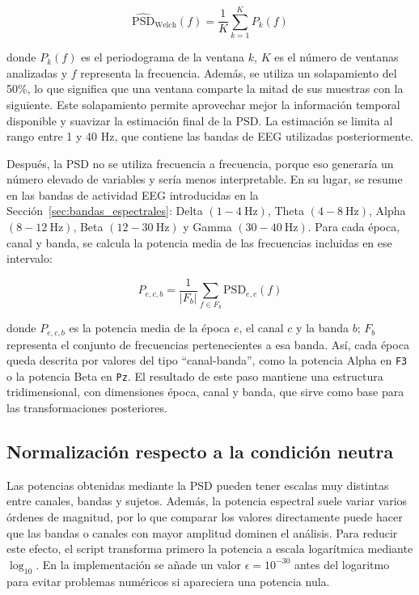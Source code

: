 \begin{myequation}[H]
\[
\widehat{\mathrm{PSD}}_{\mathrm{Welch}}(f) = \frac{1}{K}\sum_{k=1}^{K} P_k(f)
\]
\caption{Estimación de la densidad espectral de potencia mediante el método de Welch.}
\label{eq:welch_psd}
\end{myequation}

donde \(P_k(f)\) es el periodograma de la ventana \(k\), \(K\) es el número de ventanas analizadas y \(f\) representa la frecuencia. Además, se utiliza un solapamiento del 50\%, lo que significa que una ventana comparte la mitad de sus muestras con la siguiente. Este solapamiento permite aprovechar mejor la información temporal disponible y suavizar la estimación final de la \ac{PSD}. La estimación se limita al rango entre 1 y 40 Hz, que contiene las bandas de \ac{EEG} utilizadas posteriormente.


Después, la \ac{PSD} no se utiliza frecuencia a frecuencia, porque eso generaría un número elevado de variables y sería menos interpretable. En su lugar, se resume en las bandas de actividad \ac{EEG} introducidas en la Sección~\ref{sec:bandas_espectrales}: Delta \((1-4\ \mathrm{Hz})\), Theta \((4-8\ \mathrm{Hz})\), Alpha \((8-12\ \mathrm{Hz})\), Beta \((12-30\ \mathrm{Hz})\) y Gamma \((30-40\ \mathrm{Hz})\). Para cada época, canal y banda, se calcula la potencia media de las frecuencias incluidas en ese intervalo:

\begin{myequation}[H]
\[
P_{e,c,b} = \frac{1}{|F_b|}\sum_{f \in F_b}\mathrm{PSD}_{e,c}(f)
\]
\caption{Potencia media de una banda de frecuencia para una época y un canal.}
\label{eq:potencia_media_banda}
\end{myequation}

donde \(P_{e,c,b}\) es la potencia media de la época \(e\), el canal \(c\) y la banda \(b\); \(F_b\) representa el conjunto de frecuencias pertenecientes a esa banda. Así, cada época queda descrita por valores del tipo ``canal-banda'', como la potencia Alpha en \texttt{F3} o la potencia Beta en \texttt{Pz}. El resultado de este paso mantiene una estructura tridimensional, con dimensiones época, canal y banda, que sirve como base para las transformaciones posteriores.


\subsection{Normalización respecto a la condición neutra}

Las potencias obtenidas mediante la \ac{PSD} pueden tener escalas muy distintas entre canales, bandas y sujetos. Además, la potencia espectral suele variar varios órdenes de magnitud, por lo que comparar los valores directamente puede hacer que las bandas o canales con mayor amplitud dominen el análisis. Para reducir este efecto, el script transforma primero la potencia a escala logarítmica mediante \(\log_{10}\). En la implementación se añade un valor \(\epsilon = 10^{-30}\) antes del logaritmo para evitar problemas numéricos si apareciera una potencia nula.

